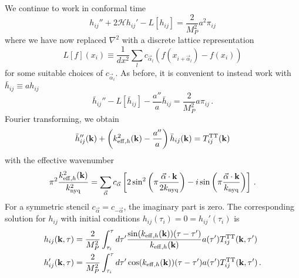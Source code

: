 \documentclass{revtex4}
\begin{document}
We continue to work in conformal time
\begin{equation}
  h_{ij}'' + 2\mathcal{H}h_{ij}' - L[h_{ij}] = \frac{2}{M_P^2}a^2\pi_{ij}
\end{equation}
where we have now replaced $\nabla^2$ with a discrete lattice representation
\begin{equation}
  L[f](x_i) \equiv \frac{1}{dx^2}\sum_l c_{\vec{\alpha}_l}\left(f(x_{i+\vec{\alpha}_l})-f(x_i)\right)
\end{equation}
for some suitable choices of $c_{\vec{\alpha}_i}$.
As before, it is convenient to instead work with $\bar{h}_{ij} \equiv ah_{ij}$
\begin{equation}
  \bar{h}_{ij}'' - L[\bar{h}_{ij}] - \frac{a''}{a}\bar{h}_{ij} = \frac{2}{M_P^2}a\pi_{ij} \, .
\end{equation}
Fourier transforming, we obtain
\begin{equation}
  \bar{h}_{ij}''({\bf k}) + \left(k_{{\rm eff},h}^2({\bf k}) -\frac{a''}{a}\right) \bar{h}_{ij}({\bf k}) = T_{ij}^{{\rm TT}}({\bf k}) 
\end{equation}
with the effective wavenumber
\begin{equation}
  \pi^2\frac{k_{{\rm eff},h}^2({\bf k})}{k_{\rm nyq}^2} = \sum_{\vec{\alpha}} c_{\vec{\alpha}}\left[2\sin^2\left(\pi\frac{\vec{\alpha}\cdot{\bf k}}{2k_{\rm nyq}}\right) - i\sin\left(\pi\frac{\vec{\alpha}\cdot{\bf k}}{k_{\rm nyq}}\right) \right] \, .
\end{equation}
For a symmetric stencil $c_{\vec{\alpha}}=c_{-\vec{\alpha}}$, the imaginary part is zero.
The corresponding solution for $h_{ij}$ with initial conditions $h_{ij}(\tau_i) = 0 = h_{ij}'(\tau_i)$ is
\begin{subequations}
\begin{align}
  h_{ij}({\bf k},\tau) &= \frac{2}{M_P^2}\int_{\tau_i}^\tau d\tau' \frac{\sin(k_{{\rm eff},h}({\bf k}))(\tau-\tau')}{k_{{\rm eff},h}({\bf k})}a(\tau')T_{ij}^{{\rm TT}}({\bf k},\tau') \\
  h'_{ij}({\bf k},\tau) &= \frac{2}{M_P^2}\int_{\tau_i}^\tau d\tau' \cos(k_{{\rm eff},h}({\bf k}))(\tau-\tau')a(\tau')T_{ij}^{{\rm TT}}({\bf k},\tau') \, .
\end{align}
\end{subequations}
\end{document}
